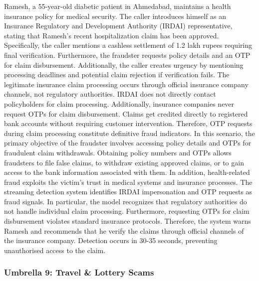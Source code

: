 \documentclass{article}
\begin{document}
Ramesh, a 55-year-old diabetic patient in Ahmedabad, maintains a health insurance policy for medical security. The caller introduces himself as an Insurance Regulatory and Development Authority (IRDAI) representative, stating that Ramesh's recent hospitalization claim has been approved. Specifically, the caller mentions a cashless settlement of 1.2 lakh rupees requiring final verification. Furthermore, the fraudster requests policy details and an OTP for claim disbursement. Additionally, the caller creates urgency by mentioning processing deadlines and potential claim rejection if verification fails. The legitimate insurance claim processing occurs through official insurance company channels, not regulatory authorities. IRDAI does not directly contact policyholders for claim processing. Additionally, insurance companies never request OTPs for claim disbursement. Claims get credited directly to registered bank accounts without requiring customer intervention. Therefore, OTP requests during claim processing constitute definitive fraud indicators. In this scenario, the primary objective of the fraudster involves accessing policy details and OTPs for fraudulent claim withdrawals. Obtaining policy numbers and OTPs allows fraudsters to file false claims, to withdraw existing approved claims, or to gain access to the bank information associated with them. In addition, health-related fraud exploits the victim's trust in medical systems and insurance processes. The streaming detection system identifies IRDAI impersonation and OTP requests as fraud signals. In particular, the model recognizes that regulatory authorities do not handle individual claim processing. Furthermore, requesting OTPs for claim disbursement violates standard insurance protocols. Therefore, the system warns Ramesh and recommends that he verify the claims through official channels of the insurance company. Detection occurs in 30-35 seconds, preventing unauthorised access to the claim.

\subsubsection{Umbrella 9: Travel \& Lottery Scams}
\label{app:casestudy:lottery}
\end{document}
